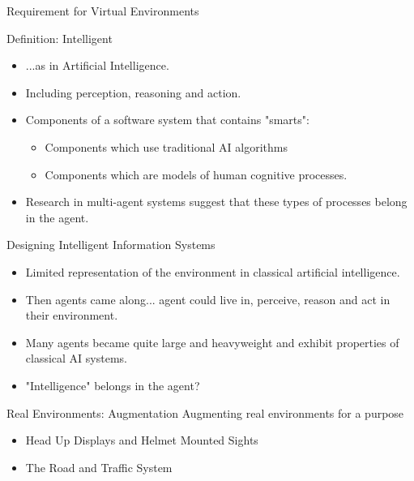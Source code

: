 \documentclass[aspectratio=1610,xcolor=dvipsnames,t]{beamer}
\begin{document}
\begin{frame}{Requirement for Virtual Environments} 
\end{frame} 

\begin{frame}{Definition: Intelligent}
    \begin{itemize}
        \item ...as in Artificial Intelligence.
        \item Including perception, reasoning and action.
        \item Components of a software system that contains "smarts":
            \begin{itemize}
                \item Components which use traditional AI algorithms
                \item Components which are models of human cognitive 
                      processes.
            \end{itemize}
        \item Research in multi-agent systems suggest that these
              types of processes belong in the agent. 
    \end{itemize}
\end{frame} 

\begin{frame}{Designing Intelligent Information Systems} 
    \begin{itemize}
        \item Limited representation of the environment in classical
              artificial intelligence.
        \item Then agents came along... agent could live in,
              perceive, reason and act in their environment.
        \item Many agents became quite large and heavyweight and
              exhibit properties of classical AI systems.
        \item "Intelligence" belongs in the agent?
    \end{itemize}
\end{frame}

\begin{frame}{Real Environments: Augmentation} 
    Augmenting real environments for a purpose
    \begin{itemize}
        \item Head Up Displays and Helmet Mounted Sights
        \item The Road and Traffic System
    \end{itemize}
\end{frame} 
\end{document}
